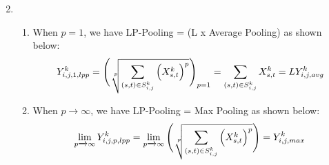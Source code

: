 \documentclass{article}
\begin{document}
\begin{enumerate}
\begin{equation}
    \end{equation}
    \item \begin{enumerate}
            \item When $p=1$, we have LP-Pooling = (L x Average Pooling) as shown below: $$Y_{i,j,1,lpp}^{k}=\Bigg(\sqrt[\leftroot{-2}\uproot{2}p]{\sum_{(s,t)\in S_{i,j}^{k}}\Big(X_{s,t}^{k}\Big)^{p}}\Bigg)_{p=1}=\sum_{(s,t)\in S_{i,j}^{k}}X_{s,t}^{k}=LY_{i,j,avg}^{k}$$
            \item When $p\xrightarrow{}\infty$, we have LP-Pooling = Max Pooling as shown below: $$\lim_{p\xrightarrow{}\infty}Y_{i,j,p,lpp}^{k}=\lim_{p\xrightarrow{}\infty}\Bigg(\sqrt[\leftroot{-2}\uproot{2}p]{\sum_{(s,t)\in S_{i,j}^{k}}\Big(X_{s,t}^{k}\Big)^{p}}\Bigg)=Y_{i,j,max}^{k}$$
        \end{enumerate}
\end{enumerate}
\end{document}
